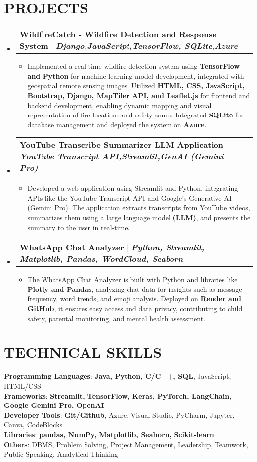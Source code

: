 \documentclass[letterpaper,11pt]{article}
\makeatletter
\newcommand{\resumeItem}[1]{\item\small{#1 \vspace{-2pt}}}
\newcommand{\resumeProjectHeading}[2]{
    \item
    \begin{tabular*}{0.97\textwidth}{l@{\extracolsep{\fill}}r}
      \small#1 & #2 \\
    \end{tabular*}\vspace{-7pt}
}
\newcommand{\resumeSubHeadingListStart}{\begin{itemize}[leftmargin=0.15in, label={}]}
\newcommand{\resumeSubHeadingListEnd}{\end{itemize}}
\newcommand{\resumeItemListStart}{\begin{itemize}}
\newcommand{\resumeItemListEnd}{\end{itemize}\vspace{-5pt}}
\makeatother
\begin{document}
\section{\textbf{PROJECTS}}
\resumeSubHeadingListStart
    \resumeProjectHeading
          {\textbf{WildfireCatch - Wildfire Detection and Response System} $|$ \emph{\textbf{Django,JavaScript,TensorFlow, SQLite,Azure}}}{}
          \resumeItemListStart
            \resumeItem{Implemented a real-time wildfire detection system using \textbf{TensorFlow and Python} for machine learning model development, integrated with geospatial remote sensing images. Utilized \textbf{HTML, CSS, JavaScript, Bootstrap, Django, MapTiler API, and Leaflet.js }for frontend and backend development, enabling dynamic mapping and visual representation of fire locations and safety zones. Integrated \textbf{SQLite} for database management and deployed the system on \textbf{Azure}.}
          \resumeItemListEnd
    \resumeProjectHeading
          {\textbf{YouTube Transcribe Summarizer LLM Application} $|$ \emph{\textbf{YouTube Transcript API,Streamlit,GenAI (Gemini Pro)}}}{}
          \resumeItemListStart
            \resumeItem{Developed a web application using Streamlit and Python, integrating APIs like the YouTube Transcript API and Google's Generative AI (Gemini Pro). The application extracts transcripts from YouTube videos, summarizes them using a large language model \textbf{(LLM)}, and presents the summary to the user in real-time.}
          \resumeItemListEnd
      \resumeProjectHeading
          {\textbf{WhatsApp Chat Analyzer} $|$ \emph{\textbf{Python, Streamlit, Matplotlib, Pandas, WordCloud, Seaborn}}}{}
          \resumeItemListStart
            \resumeItem{The WhatsApp Chat Analyzer is built with Python and libraries like \textbf{Plotly and Pandas}, analyzing chat data for insights such as message frequency, word trends, and emoji analysis. Deployed on \textbf{Render and GitHub}, it ensures easy access and data privacy, contributing to child safety, parental monitoring, and mental health assessment.}
          \resumeItemListEnd
\resumeSubHeadingListEnd

\section{\textbf{TECHNICAL SKILLS}}
\begin{itemize}[leftmargin=0.15in, label={}]
    \small{\item{
     \textbf{Programming Languages}{: \textbf{Java, Python, C/C++, SQL}, JavaScript, HTML/CSS} \\
     \textbf{Frameworks}{: \textbf{Streamlit, TensorFlow, Keras, PyTorch, LangChain, Google Gemini Pro, OpenAI}} \\
     \textbf{Developer Tools}{: \textbf{Git/Github}, Azure, Visual Studio, PyCharm, Jupyter, Canva, CodeBlocks} \\
     \textbf{Libraries}{: \textbf{pandas, NumPy, Matplotlib, Seaborn, Scikit-learn}} \\
     \textbf{Others}{: DBMS, Problem Solving, Project Management, Leadership, Teamwork, Public Speaking, Analytical Thinking}
    }}
\end{itemize}
\end{document}
